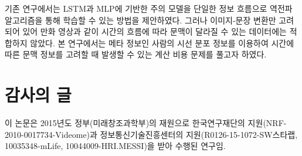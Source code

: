 \documentclass{kcc}
\begin{document}
기존 연구에서는 LSTM과 MLP에 기반한 주의 모델을 단일한 정보 흐름으로 역전파 알고리즘을 통해 학습할 수 있는 방법을 제안하였다. 그러나 이미지-문장 변환만 고려되어 있어 만화 영상과 같이 시간의 흐름에 따라 문맥이 달라질 수 있는 데이터에는 적합하지 않았다. 본 연구에서는 메타 정보인 사람의 시선 분포 정보를 이용하여 시간에 따른 문맥 정보를 고려할 때 발생할 수 있는 계산 비용 문제를 풀고자 하였다.  

\section{감사의 글}
이 논문은 2015년도 정부(미래창조과학부)의 재원으로 한국연구재단의 지원(NRF-2010-0017734-Videome)과 정보통신기술진흥센터의 지원(R0126-15-1072-SW스타랩, 10035348-mLife, 10044009-HRI.MESSI)을 받아 수행된 연구임.



\end{document}
